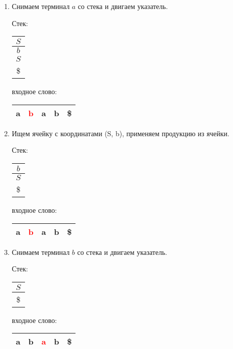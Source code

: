 \begin{example}
\begin{enumerate}
\item Снимаем терминал $a$ со стека и двигаем указатель.
    
    Стек: \,
    \begin{tabular}[c]{ |c| } 
        \\ \hline
        $S$ \\ \hline
        $b$ \\ \hline
        $S$ \\ \hline
        \$ \\ \hline
    \end{tabular}  
    \qquad  \qquad \qquad  \qquad входное слово: \,
    \begin{tabular}[c]{ |c|c|c|c|c| } 
        \hline
        a & \textcolor{red}{b} & a & b & \$ \\ \hline
    \end{tabular}

\item Ищем ячейку с координатами (S, b), применяем продукцию из ячейки.

    Стек: \,
    \begin{tabular}[c]{ |c| } 
        \\ \hline
        $b$ \\ \hline
        $S$ \\ \hline
        \$ \\ \hline
    \end{tabular}  
    \qquad  \qquad \qquad  \qquad входное слово: \,
    \begin{tabular}[c]{ |c|c|c|c|c| } 
        \hline
        a & \textcolor{red}{b} & a & b & \$ \\ \hline
    \end{tabular}

\item Снимаем терминал $b$ со стека и двигаем указатель.

    Стек: \,
    \begin{tabular}[c]{ |c| } 
        \\ \hline
        $S$ \\ \hline
        \$ \\ \hline
    \end{tabular}  
    \qquad  \qquad \qquad  \qquad входное слово: \,
    \begin{tabular}[c]{ |c|c|c|c|c| } 
        \hline
        a & b & \textcolor{red}{a} & b & \$ \\ \hline
    \end{tabular}
  

\end{enumerate}
\end{example}
